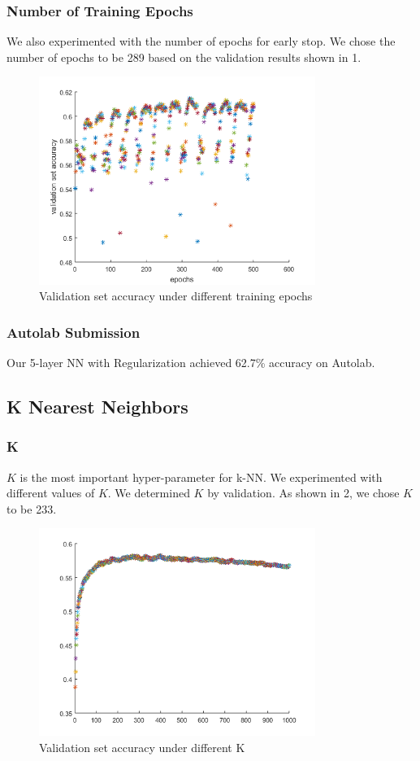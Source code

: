 \documentclass{article} %
\begin{document}
\subsubsection{Number of Training Epochs}
We also experimented with the number of epochs for early stop. We chose the number of epochs to be 289 based on the validation results shown in \figurename{1}.
\begin{figure}[ht!]
	\centering
	\includegraphics[width=90mm]{dnn_train_500.png}
	\caption{Validation set accuracy under different training epochs}
\end{figure}

\subsubsection{Autolab Submission}
Our 5-layer NN with Regularization achieved 62.7\% accuracy on Autolab.


\subsection{K Nearest Neighbors}

\subsubsection{K}
$K$ is the most important hyper-parameter for k-NN. We experimented with different values of $K$. We determined $K$ by validation. As shown in \figurename{2}, we chose $K$ to be 233.
\begin{figure}[ht!]
	\centering
	\includegraphics[width=90mm]{knn.png}
	\caption{Validation set accuracy under different K}
\end{figure}
\end{document}
